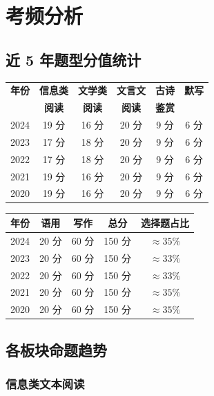 \section{考频分析}

\subsection{近 5 年题型分值统计}

\begin{center}
\begin{tabular}{c|c|c|c|c|c}
\textbf{年份} & \textbf{信息类} & \textbf{文学类} & \textbf{文言文} & \textbf{古诗} & \textbf{默写} \\
 & \textbf{阅读} & \textbf{阅读} & \textbf{阅读} & \textbf{鉴赏} &  \\ \hline
2024 & 19 分 & 16 分 & 20 分 & 9 分 & 6 分 \\
2023 & 17 分 & 18 分 & 20 分 & 9 分 & 6 分 \\
2022 & 17 分 & 18 分 & 20 分 & 9 分 & 6 分 \\
2021 & 19 分 & 16 分 & 20 分 & 9 分 & 6 分 \\
2020 & 19 分 & 16 分 & 20 分 & 9 分 & 6 分
\end{tabular}
\end{center}

\begin{center}
\begin{tabular}{c|c|c|c|c}
\textbf{年份} & \textbf{语用} & \textbf{写作} & \textbf{总分} & \textbf{选择题占比} \\ \hline
2024 & 20 分 & 60 分 & 150 分 & $\approx 35\%$ \\
2023 & 20 分 & 60 分 & 150 分 & $\approx 33\%$ \\
2022 & 20 分 & 60 分 & 150 分 & $\approx 33\%$ \\
2021 & 20 分 & 60 分 & 150 分 & $\approx 35\%$ \\
2020 & 20 分 & 60 分 & 150 分 & $\approx 35\%$
\end{tabular}
\end{center}

\subsection{各板块命题趋势}

\subsubsection{信息类文本阅读}

